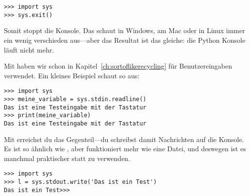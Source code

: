 \begin{Verbatim}[frame=single]
>>> import sys
>>> sys.exit()
\end{Verbatim}

Somit stoppt die Konsole. Das schaut in Windows, am Mac oder in Linux immer ein wenig verschieden aus---aber das Resultat ist das gleiche: die Python Konsole läuft nicht mehr.

Mit  haben wir schon in Kapitel~\ref{ch:sortoflikerecycling} für Benutzereingaben verwendet. Ein kleines Beispiel schaut so aus:

\begin{Verbatim}[frame=single]
>>> import sys
>>> meine_variable = sys.stdin.readline()
Das ist eine Testeingabe mit der Tastatur
>>> print(meine_variable)
Das ist eine Testeingabe mit der Tastatur
\end{Verbatim}

Mit  erreichst du das Gegenteil---du schreibst damit Nachrichten auf die Konsole. Es ist so ähnlich wie , aber funktioniert mehr wie eine Datei, und deswegen ist es manchmal praktischer  statt  zu verwenden.

\begin{Verbatim}[frame=single]
>>> import sys
>>> l = sys.stdout.write('Das ist ein Test')
Das ist ein Test>>>
\end{Verbatim}

